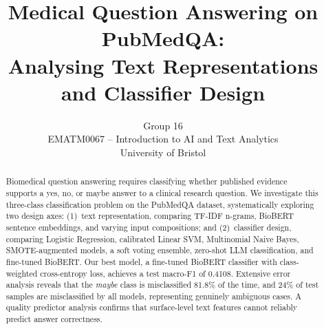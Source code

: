 \documentclass[11pt]{article}
\title{Medical Question Answering on PubMedQA:\\Analysing Text Representations and Classifier Design}
\author{Group 16 \\
  EMATM0067 -- Introduction to AI and Text Analytics \\
  University of Bristol}
\begin{document}
\maketitle

\begin{abstract}
Biomedical question answering requires classifying whether published evidence supports a yes, no, or maybe answer to a clinical research question. We investigate this three-class classification problem on the PubMedQA dataset, systematically exploring two design axes: (1)~text representation, comparing TF-IDF n-grams, BioBERT sentence embeddings, and varying input compositions; and (2)~classifier design, comparing Logistic Regression, calibrated Linear SVM, Multinomial Naive Bayes, SMOTE-augmented models, a soft voting ensemble, zero-shot LLM classification, and fine-tuned BioBERT. Our best model, a fine-tuned BioBERT classifier with class-weighted cross-entropy loss, achieves a test macro-F1 of 0.4108. Extensive error analysis reveals that the \textit{maybe} class is misclassified 81.8\% of the time, and 24\% of test samples are misclassified by all models, representing genuinely ambiguous cases. A quality predictor analysis confirms that surface-level text features cannot reliably predict answer correctness.
\end{abstract}
\end{document}
